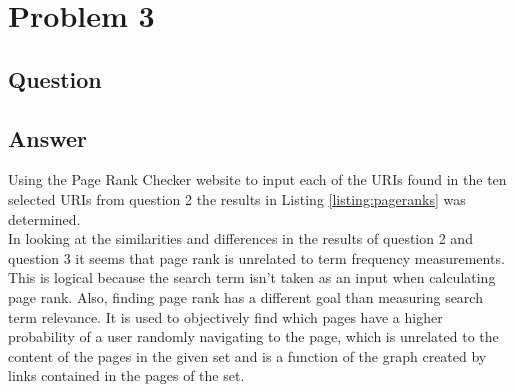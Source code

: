 \section{Problem 3}

\subsection{Question}



\subsection{Answer}
Using the Page Rank Checker website to input each of the URIs found in the ten selected URIs from question 2 the results in Listing \ref{listing:pageranks} was determined.\\



In looking at the similarities and differences in the results of question 2 and question 3 it seems that page rank is unrelated to term frequency measurements. This is logical because the search term isn't taken as an input when calculating page rank. Also, finding page rank has a different goal than measuring search term relevance. It is used to objectively find which pages have a higher probability of a user randomly navigating to the page, which is unrelated to the content of the pages in the given set and is a function of the graph created by links contained in the pages of the set.